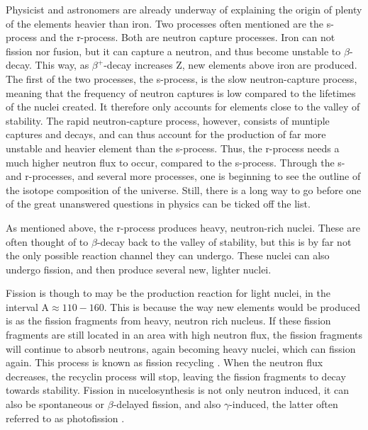 \documentclass[]{article}
\begin{document}
\par
\vspace{3mm}

 \noindent Physicist and astronomers are already underway of explaining the origin of plenty of the elements heavier than iron. Two processes often mentioned are the s-process and the r-process. Both are neutron capture processes. Iron can not fission nor fusion, but it can capture a neutron, and thus become unstable to $\beta$-decay. This way, as $\beta^{+}$-decay increases Z, new elements above iron are produced. The first of the two processes, the s-process, is the slow neutron-capture process, meaning that the frequency of neutron captures is low compared to the lifetimes of the nuclei created. It therefore only accounts for elements close to the valley of stability. The rapid neutron-capture process, however, consists of muntiple captures and decays, and can thus account for the production of far more unstable and heavier element than the s-process. Thus, the r-process needs a much higher neutron flux to occur, compared to the s-process. Through the s- and r-processes, and several more processes, one is beginning to see the outline of the isotope composition of the universe. Still, there is a long way to go before one of the great unanswered questions in physics can be ticked off the list.

\par 
\vspace{3mm}

 \noindent As mentioned above, the r-process produces heavy, neutron-rich nuclei. These are often thought of to $\beta$-decay back to the valley of stability, but this is by far not the only possible reaction channel they can undergo. These nuclei can also undergo fission, and then produce several new, lighter nuclei.

\par 
\vspace{3mm}
 \noindent Fission is though to may be the production reaction for light nuclei, in the interval A$\approx 110 - 160$. This is because the way new elements would be produced is as the fission fragments from heavy, neutron rich nucleus. If these fission fragments are still located in an area with high neutron flux, the fission fragments will continue to absorb neutrons, again becoming heavy nuclei, which can fission again. This process is known as fission recycling \cite{Goriely2017}. When the neutron flux decreases, the recyclin process will stop, leaving the fission fragments to decay towards stability. Fission in nucelosynthesis is not only neutron induced, it can also be spontaneous or $\beta$-delayed fission, and also $\gamma$-induced, the latter often referred to as photofission \cite{Goriely2017}. 
\end{document}
